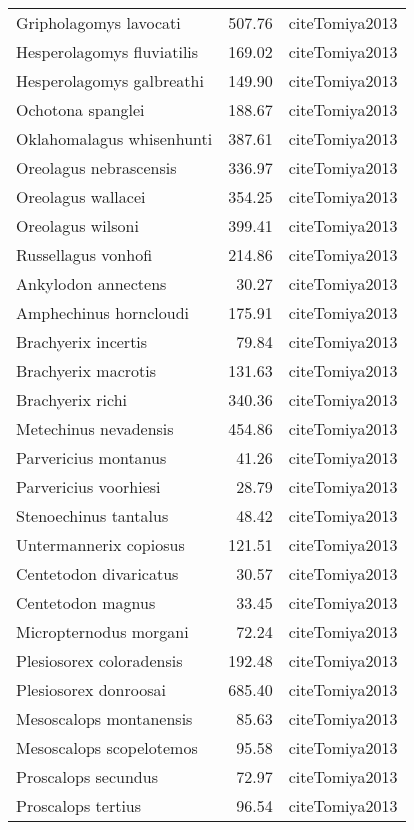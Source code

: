 \begin{table}[ht]
\begin{tabular}{lrl}
  Gripholagomys lavocati & 507.76 & cite{Tomiya2013} \\ 
  Hesperolagomys fluviatilis & 169.02 & cite{Tomiya2013} \\ 
  Hesperolagomys galbreathi & 149.90 & cite{Tomiya2013} \\ 
  Ochotona spanglei & 188.67 & cite{Tomiya2013} \\ 
  Oklahomalagus whisenhunti & 387.61 & cite{Tomiya2013} \\ 
  Oreolagus nebrascensis & 336.97 & cite{Tomiya2013} \\ 
  Oreolagus wallacei & 354.25 & cite{Tomiya2013} \\ 
  Oreolagus wilsoni & 399.41 & cite{Tomiya2013} \\ 
  Russellagus vonhofi & 214.86 & cite{Tomiya2013} \\ 
  Ankylodon annectens & 30.27 & cite{Tomiya2013} \\ 
  Amphechinus horncloudi & 175.91 & cite{Tomiya2013} \\ 
  Brachyerix incertis & 79.84 & cite{Tomiya2013} \\ 
  Brachyerix macrotis & 131.63 & cite{Tomiya2013} \\ 
  Brachyerix richi & 340.36 & cite{Tomiya2013} \\ 
  Metechinus nevadensis & 454.86 & cite{Tomiya2013} \\ 
  Parvericius montanus & 41.26 & cite{Tomiya2013} \\ 
  Parvericius voorhiesi & 28.79 & cite{Tomiya2013} \\ 
  Stenoechinus tantalus & 48.42 & cite{Tomiya2013} \\ 
  Untermannerix copiosus & 121.51 & cite{Tomiya2013} \\ 
  Centetodon divaricatus & 30.57 & cite{Tomiya2013} \\ 
  Centetodon magnus & 33.45 & cite{Tomiya2013} \\ 
  Micropternodus morgani & 72.24 & cite{Tomiya2013} \\ 
  Plesiosorex coloradensis & 192.48 & cite{Tomiya2013} \\ 
  Plesiosorex donroosai & 685.40 & cite{Tomiya2013} \\ 
  Mesoscalops montanensis & 85.63 & cite{Tomiya2013} \\ 
  Mesoscalops scopelotemos & 95.58 & cite{Tomiya2013} \\ 
  Proscalops secundus & 72.97 & cite{Tomiya2013} \\ 
  Proscalops tertius & 96.54 & cite{Tomiya2013} \\ 

\end{tabular}
\end{table}
